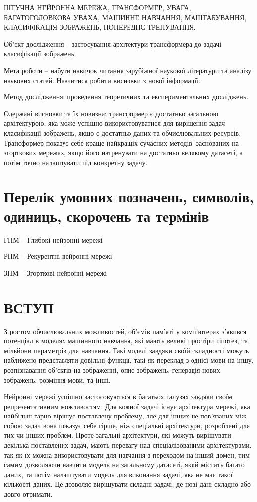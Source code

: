 \documentclass[a4paper,14pt]{extreport}
\newcommand\uchapter[1]{%
  \addcontentsline{toc}{chapter}{\xmakefirstuc{\lowercase{#1}}}%
  \chapter*{#1}}
\begin{document}
ШТУЧНА НЕЙРОННА МЕРЕЖА, ТРАНСФОРМЕР,
УВАГА, БАГАТОГОЛОВКОВА УВАХА, МАШИННЕ НАВЧАННЯ,
МАШТАБУВАННЯ, КЛАСИФІКАЦІЯ ЗОБРАЖЕНЬ,
ПОПЕРЕДНЄ ТРЕНУВАННЯ.

Об’єкт дослідження -- застосування архітектури
трансформера до задачі класифікації зображень.

Мета роботи -- набути навичок читання зарубіжної наукової літератури та аналізу наукових статей. Навчитися робити висновки з нової інформації.

Метод дослідження: проведення теоретичних та експериментальних досліджень.

Одержані висновки та їх новизна: трансформер є достатньо загальною
архітектурою, яка може успішно використовуватися для вирішення задач
класифікації зображень, якщо є достатньо даних та обчислювальних ресурсів.
Трансформер показує себе краще найкращіх сучасних методів, заснованих на
згорткових мережах, якщо його натренувати на достатньо великому датасеті,
а потім точно налаштувати під конкретну задачу.

\newpage
\tableofcontents

\newpage
\chapter*{Перелік умовних позначень, символів, одиниць, скорочень та термінів}
ГНМ -- Глибокі нейронні мережі

РНМ -- Рекурентні нейронні мережі

ЗНМ -- Згорткові нейронні мережі



\newpage
{}
\setcounter{page}{7}
\uchapter{ВСТУП}
З ростом обчислювальних можливостей, об'ємів пам'яті у комп'ютерах
з'явився потенціал в моделях машинного навчання, які мають
великі простіри гіпотез, та мільйони параметрів для навчання.
Такі моделі завдяки своїй складності можуть наближено представляти
довільні функції, такі як переклад з однієї мови на іншу,
розпізнавання об'єктів на зображенні, опис зображень,
генерація нових зображень, розміння мови, та інші.

Нейронні мережі успішно застосовуються в багатьох галузях
завдяки своїм репрезентативним можливостям. Для кожної задачі
існує архітектура мережі, яка найбільш гарно вірішує поставлену
проблему, але для інших не пов'язаних між собою задач вона
показує себе гірше, ніж спеціальні архітектури, розроблені
для тих чи інших проблем. Проте загальні архітектури,
які можуть вирішувати декілька поставлених задач, мають
перевагу над спеціалізованими архітектурами, так як їх
можна використовувати для навчання з переходом на інший домен,
тим самим дозволяючи навчити модель на загальному датасеті,
який містить багато даних,
та потім налаштувати модель для виконання задачі, яка не має такої
кількості даних. Це дозволяє вирішувати складні задачі, де
нові дані складно або довго отримати.
\end{document}
